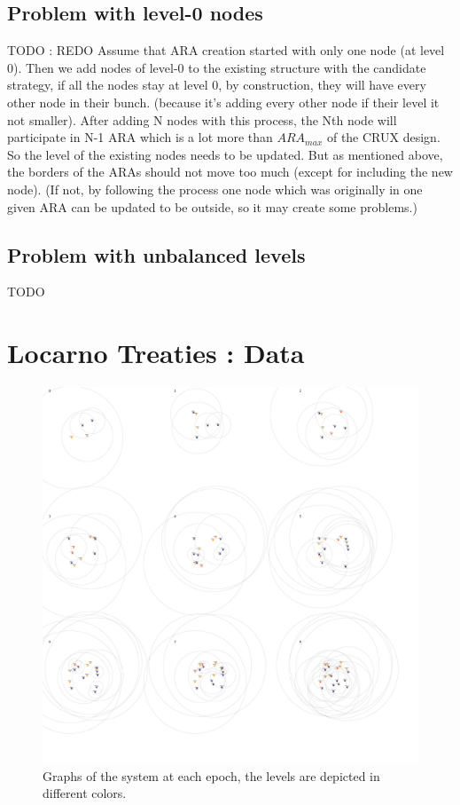 \documentclass[a4paper,11pt,oneside]{report}
\begin{document}
\section{Problem with level-0 nodes} \label{app:levels-zero}
\color{red} TODO : REDO \color{black}
Assume that ARA creation started with only one node (at level 0). Then we add nodes of level-0 to the existing structure with the candidate strategy, if all the nodes stay at level 0, by construction, they will have every other node in their bunch. (because it’s adding every other node if their level it not smaller). After adding N nodes with this process, the Nth node will participate in N-1 ARA which is a lot more than $ARA_{max}$ of the CRUX \cite{Basescu2014} design. 
So the level of the existing nodes needs to be updated. But as mentioned above, the borders of the ARAs should not move too much (except for including the new node). (If not, by following the process one node which was originally in one given ARA can be updated to be outside, so it may create some problems.)

\section{Problem with unbalanced levels } \label{app:unbalanced-levels}

\color{red} TODO  \color{black}

\chapter{Locarno Treaties : Data} \label{app:LocarnoTreaties-data}

\begin{figure}[!h] 
\centering
\includegraphics[width=350pt]{figures/LocarnoTreaties-RandomFinal}
\caption{Graphs of the system at each epoch, the levels are depicted in different colors.}
\label{fig:LocarnoTreaties-RandomFinal}
\end{figure}
\end{document}
